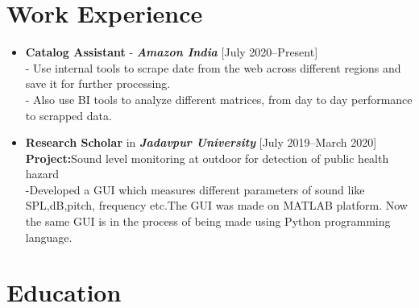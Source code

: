 \documentclass[11pt,a4paper]{moderncv}
\begin{document}

\section{Work Experience}

\begin{itemize}
	
	\item \textbf{Catalog Assistant} - \textit{\textbf{Amazon India}} \hfill [July 2020--Present]\\
	- Use internal tools to scrape date from the web across different regions and save it for further processing.\\
	- Also use BI tools to analyze different matrices, from day to day performance to scrapped data.\\
		
	
	\item \textbf{Research Scholar} in \textit{\textbf{Jadavpur University}} \hfill [July 2019--March 2020]\\
	\textbf{Project:}Sound level monitoring at
	outdoor for detection of public health hazard\\
	-Developed a GUI which measures different parameters of sound like
	SPL,dB,pitch, frequency etc.The GUI was made on MATLAB platform. Now the
	same GUI is in the process of being made using Python programming language.
	
	
\end{itemize}

\section{Education}
\end{document}
